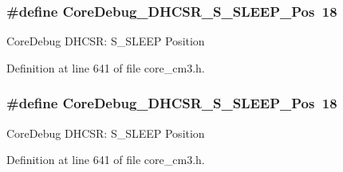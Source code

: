 \subsubsection[{\texorpdfstring{Core\+Debug\+\_\+\+D\+H\+C\+S\+R\+\_\+\+S\+\_\+\+S\+L\+E\+E\+P\+\_\+\+Pos}{CoreDebug_DHCSR_S_SLEEP_Pos}}]{\setlength{\rightskip}{0pt plus 5cm}\#define Core\+Debug\+\_\+\+D\+H\+C\+S\+R\+\_\+\+S\+\_\+\+S\+L\+E\+E\+P\+\_\+\+Pos~18}\hypertarget{group___c_m_s_i_s___c_m3___core_debug_ga349ccea33accc705595624c2d334fbcb}{}\label{group___c_m_s_i_s___c_m3___core_debug_ga349ccea33accc705595624c2d334fbcb}
Core\+Debug D\+H\+C\+SR\+: S\+\_\+\+S\+L\+E\+EP Position 

Definition at line 641 of file core\+\_\+cm3.\+h.

\subsubsection[{\texorpdfstring{Core\+Debug\+\_\+\+D\+H\+C\+S\+R\+\_\+\+S\+\_\+\+S\+L\+E\+E\+P\+\_\+\+Pos}{CoreDebug_DHCSR_S_SLEEP_Pos}}]{\setlength{\rightskip}{0pt plus 5cm}\#define Core\+Debug\+\_\+\+D\+H\+C\+S\+R\+\_\+\+S\+\_\+\+S\+L\+E\+E\+P\+\_\+\+Pos~18}\hypertarget{group___c_m_s_i_s___c_m3___core_debug_ga349ccea33accc705595624c2d334fbcb}{}\label{group___c_m_s_i_s___c_m3___core_debug_ga349ccea33accc705595624c2d334fbcb}
Core\+Debug D\+H\+C\+SR\+: S\+\_\+\+S\+L\+E\+EP Position 

Definition at line 641 of file core\+\_\+cm3.\+h.

